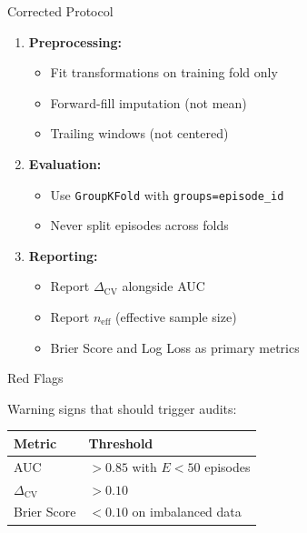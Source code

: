 \documentclass[aspectratio=169]{beamer}
\begin{document}
\begin{frame}{Corrected Protocol}
\begin{enumerate}
\item \textbf{Preprocessing:}
\begin{itemize}
\item Fit transformations on training fold only
\item Forward-fill imputation (not mean)
\item Trailing windows (not centered)
\end{itemize}

\vspace{0.5em}
\item \textbf{Evaluation:}
\begin{itemize}
\item Use \texttt{GroupKFold} with \texttt{groups=episode\_id}
\item \alert{Never split episodes across folds}
\end{itemize}

\vspace{0.5em}
\item \textbf{Reporting:}
\begin{itemize}
\item Report $\Delta_{\text{CV}}$ alongside AUC
\item Report $n_{\text{eff}}$ (effective sample size)
\item Brier Score and Log Loss as primary metrics
\end{itemize}
\end{enumerate}
\end{frame}

\begin{frame}{Red Flags}
\begin{center}
\Large\alert{Warning signs that should trigger audits:}

\vspace{1em}
\begin{tabular}{ll}
\toprule
\textbf{Metric} & \textbf{Threshold} \\
\midrule
AUC & $> 0.85$ with $E < 50$ episodes \\
$\Delta_{\text{CV}}$ & $> 0.10$ \\
Brier Score & $< 0.10$ on imbalanced data \\
\bottomrule
\end{tabular}

\vspace{2em}
\\
\end{center}
\end{frame}
\end{document}
